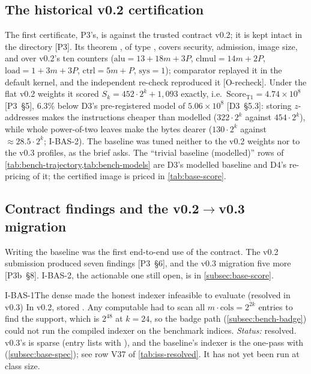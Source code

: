 \subsection{The historical v0.2 certification}\label{subsec:base-v02}

The first certificate, P3's, is against the trusted contract v0.2; it is kept intact in the directory
 [P3]. Its theorem , of type
, covers
security, admission, image size,  and  over v0.2's ten
counters ($\mathrm{alu}=13+18m+3P$, $\mathrm{clmul}=14m+2P$, $\mathrm{load}=1+3m+3P$,
$\mathrm{ctrl}=5m+P$, $\mathrm{sys}=1$); comparator replayed it in the default kernel, and the
independent re-check reproduced it [O-recheck]. Under the flat v0.2 weights it scored
$S_k=452\cdot2^k+1{,}093$ exactly, i.e.\ $\mathrm{Score}_{\mathrm{T1}}=4.74\times10^8$ [P3~§5], 6.3\%
below D3's pre-registered model of $5.06\times10^8$ [D3~§5.3]: storing $z$-addresses makes the
instructions cheaper than modelled ($322\cdot2^k$ against $454\cdot2^k$), while whole power-of-two
leaves make the bytes dearer ($130\cdot2^k$ against $\approx28.5\cdot2^k$; I-BAS-2). The baseline
was tuned neither to the v0.2 weights nor to the v0.3 profiles, as the brief asks. The ``trivial
baseline (modelled)'' rows of \cref{tab:bench-trajectory,tab:bench-models} are D3's modelled
baseline and D4's re-pricing of it; the certified image is priced in \cref{tab:base-score}.

\subsection{Contract findings and the v0.2\texorpdfstring{$\to$}{ to }v0.3 migration}\label{subsec:base-findings}

Writing the baseline was the first end-to-end use of the contract. The v0.2 submission produced seven
findings [P3~§6], and the v0.3 migration five more [P3b~§8]. I-BAS-2, the actionable one still open,
is in \cref{subsec:base-score}.

\begin{issue}{I-BAS-1}{The dense  made the honest indexer infeasible to evaluate (resolved in v0.3)}
In v0.2,  stored . Any computable  had
to scan all $m\cdot\mathrm{cols}=2^{2k}$ entries to find the support, which is $2^{48}$ at $k=24$, so
the badge path (\cref{subsec:bench-badge}) could not run the compiled indexer on the benchmark
indices. \emph{Status:} resolved. v0.3's  is sparse (entry lists with
), and the baseline's indexer is the one-pass  with 
(\cref{subsec:base-spec}); see row V37 of \cref{tab:iss-resolved}. It has not yet been run at class
size.
\end{issue}

